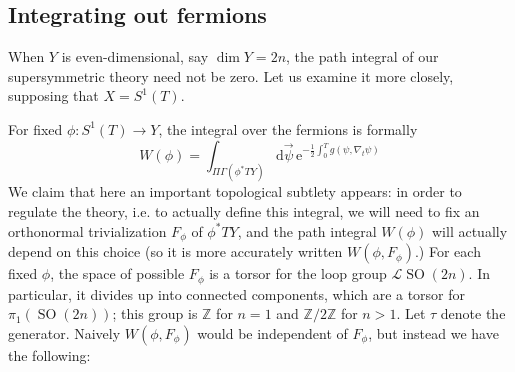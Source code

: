\documentclass[12pt,letterpaper,reqno]{article}
\numberwithin{equation}{section}
\newcommand{\cC}{\ensuremath{\mathcal C}}
\newcommand{\cL}{\ensuremath{\mathcal L}}
\newcommand{\Z}{\ensuremath{\mathbb Z}}
\newcommand{\half}{\ensuremath{\frac{1}{2}}}
\newcommand{\e}{{\mathrm e}}
\newcommand{\de}{\mathrm{d}}
\DeclareMathOperator{\SO}{SO}
\newcommand{\fixme}[1]{{\color{orange}{[#1]}}}
\begin{document}
\subsection{Integrating out fermions} \label{sec:susy-discretization}

\fixme{warning, doing this by discretization seems to be subtle, because
of fermion doubling problem! need to give some explicit way of understanding
the result here}




When $Y$ is even-dimensional,
say $\dim Y = 2n$, the path integral of our
supersymmetric theory
need not be zero. Let us examine it more closely,
supposing that $X = S^1(T)$.

For fixed $\phi: S^1(T) \to Y$, the integral over the fermions is formally
\begin{equation}
  W(\phi) = \int_{\Pi \Gamma(\phi^* TY)} \de \vec\psi \, \e^{- \half \int_{0}^T g(\psi, \nabla_t \psi)} 
\end{equation}
We claim that
here an important topological subtlety appears: in order to regulate
the theory, i.e. to actually define this integral, 
we will need to fix an orthonormal
trivialization $F_\phi$ of $\phi^* TY$,
and the path integral $W(\phi)$ will actually depend on this choice
(so it is more accurately written $W(\phi, F_\phi)$.)
For each fixed $\phi$, 
the space of possible $F_\phi$ is a torsor
for the loop group $\cL\SO(2n)$. In particular, it
divides up into connected components, which are a torsor for
$\pi_1(\SO(2n))$; this group is $\Z$ for $n=1$ and $\Z / 2\Z$
for $n>1$. Let $\tau$ denote the generator.
Naively $W(\phi, F_\phi)$ would be independent of $F_\phi$,
but instead we have the following:
\end{document}
